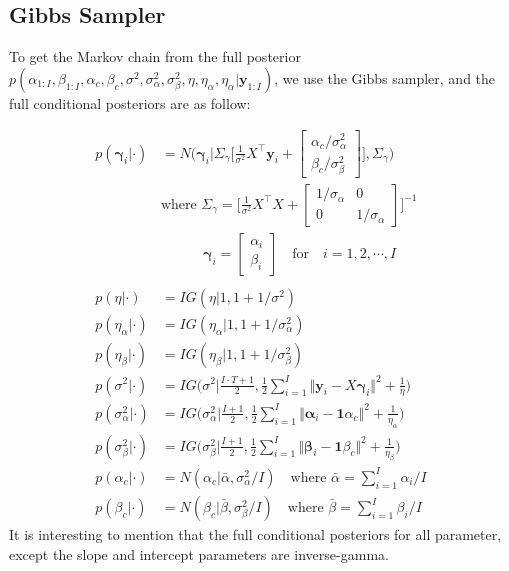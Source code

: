 \documentclass[11pt,a4paper]{article}
\begin{document}
\subsection{Gibbs Sampler}
To get the Markov chain from the full posterior $p(\alpha_{1:I},\beta_{1:I}, \alpha_{c},\beta_{c}, \sigma^{2}, \sigma_{\alpha}^{2}, \sigma_{\beta}^{2}, \eta, \eta_{\alpha},\eta_{\alpha} | \textbf{y}_{1:I} )$, we use the Gibbs sampler, and the full conditional posteriors are as follow:


\begin{align}
p(\bm{\gamma}_{i} | \cdot ) &= 
N \bigg(\bm{\gamma}_{i} \bigg |
\Sigma_{\gamma} 
\bigg[ 
\frac{1}{\sigma^{2}}
X^{\top} \bm{y}_{i}
+ 
\begin{bmatrix}
\alpha_{c}/\sigma_{\alpha}^{2} \\
\beta_{c}/\sigma_{\beta}^{2} 
\end{bmatrix}
\bigg], 
\Sigma_{\gamma}
 \bigg)\\
& \text{where }
\Sigma_{\gamma}
=
\bigg[
\frac{1}{\sigma^{2}}X^{\top}X
+ 
\begin{bmatrix}
1/\sigma_{\alpha} & 0 \\
0 & 
1/\sigma_{\alpha}
\end{bmatrix}
\bigg]^{-1}\\
& \quad \quad \quad \bm{\gamma}_{i}
= 
\begin{bmatrix}
\alpha_{i} \\
\beta_{i}
\end{bmatrix}
\quad
\text{for} \quad i = 1, 2, \cdots, I\\
\\
p(\eta | \cdot ) & = IG(\eta | 1, 1 + 1/\sigma^{2})\\
p(\eta_{\alpha} | \cdot ) & = IG(\eta_{\alpha} | 1, 1 + 1/\sigma_{\alpha}^{2})\\
p(\eta_{\beta} | \cdot ) &= IG(\eta_{\beta} | 1, 1 + 1/\sigma_{\beta}^{2})\\
p(\sigma^{2} | \cdot ) &= IG\bigg(\sigma^{2} \bigg| \frac{I\cdot T +1}{2}, \frac{1}{2} \sum_{i = 1}^{I} \Vert 
\textbf{y}_{i} - X \bm{\gamma}_{i} \Vert ^{2} + \frac{1}{\eta}
 \bigg)\\
p(\sigma_{\alpha}^{2} | \cdot ) &= IG\bigg(\sigma_{\alpha}^{2} \bigg| \frac{I +1}{2}, \frac{1}{2} \sum_{i = 1}^{I} \Vert 
\bm{\alpha}_{i} - \textbf{1} \alpha_{c} \Vert ^{2} + \frac{1}{\eta_{\alpha}}
 \bigg)\\
p(\sigma_{\beta}^{2} | \cdot ) &= IG\bigg(\sigma_{\beta}^{2} \bigg| \frac{I +1}{2}, \frac{1}{2} \sum_{i = 1}^{I} \Vert 
\bm{\beta}_{i} - \textbf{1} \beta_{c} \Vert ^{2} + \frac{1}{\eta_{\beta}}
 \bigg)\\
p(\alpha_{c} | \cdot ) &=N(\alpha_{c} | \bar{\alpha}, \sigma_{\alpha}^{2}/I )
\quad \text{where   } \bar{\alpha} = \sum_{i=1}^{I} \alpha_{i} \bigg/ I
\\
p(\beta_{c} | \cdot ) &=N(\beta_{c} | \bar{\beta}, \sigma_{\beta}^{2}/I )
\quad \text{where   } \bar{\beta} = \sum_{i=1}^{I} \beta_{i} \bigg/I
\end{align}
It is interesting to mention that the full conditional posteriors for all parameter, except the slope and intercept parameters are inverse-gamma. 
\end{document}
